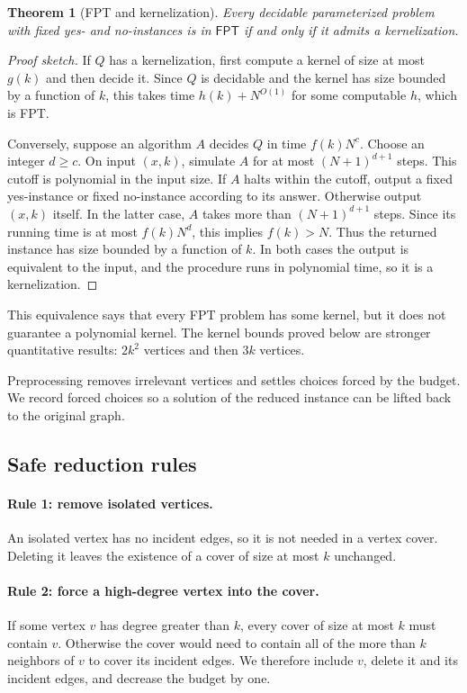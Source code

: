 \documentclass[11pt]{article}
\newtheorem{theorem}{Theorem}[section]
\newcommand{\FPT}{\textsf{FPT}}
\begin{document}
\begin{theorem}[FPT and kernelization]
Every decidable parameterized problem with fixed yes- and no-instances is in $\FPT$ if and only if it admits a kernelization.
\end{theorem}
\begin{proof}[Proof sketch]
If $Q$ has a kernelization, first compute a kernel of size at most $g(k)$ and then decide it. Since $Q$ is decidable and the kernel has size bounded by a function of $k$, this takes time $h(k)+N^{O(1)}$ for some computable $h$, which is FPT.

Conversely, suppose an algorithm $A$ decides $Q$ in time $f(k)N^c$. Choose an integer $d\geq c$. On input $(x,k)$, simulate $A$ for at most $(N+1)^{d+1}$ steps. This cutoff is polynomial in the input size. If $A$ halts within the cutoff, output a fixed yes-instance or fixed no-instance according to its answer. Otherwise output $(x,k)$ itself. In the latter case, $A$ takes more than $(N+1)^{d+1}$ steps. Since its running time is at most $f(k)N^d$, this implies $f(k)>N$. Thus the returned instance has size bounded by a function of $k$. In both cases the output is equivalent to the input, and the procedure runs in polynomial time, so it is a kernelization.
\end{proof}

This equivalence says that every FPT problem has some kernel, but it does not guarantee a polynomial kernel. The kernel bounds proved below are stronger quantitative results: $2k^2$ vertices and then $3k$ vertices.

Preprocessing removes irrelevant vertices and settles choices forced by the budget. We record forced choices so a solution of the reduced instance can be lifted back to the original graph.

\subsection{Safe reduction rules}

\paragraph{Rule 1: remove isolated vertices.} An isolated vertex has no incident edges, so it is not needed in a vertex cover. Deleting it leaves the existence of a cover of size at most $k$ unchanged.

\paragraph{Rule 2: force a high-degree vertex into the cover.} If some vertex $v$ has degree greater than $k$, every cover of size at most $k$ must contain $v$. Otherwise the cover would need to contain all of the more than $k$ neighbors of $v$ to cover its incident edges. We therefore include $v$, delete it and its incident edges, and decrease the budget by one.
\end{document}
